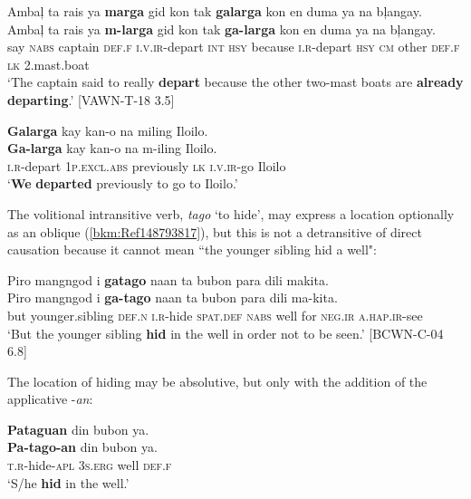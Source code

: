 \ea
\label{bkm:Ref148793705}
Ambaļ  ta  rais  ya  \textbf{marga}  gid  kon  tak \textbf{galarga}  kon  en  duma  ya  na  bļangay. \\\smallskip
\gll Ambaļ  ta  rais  ya  \textbf{m-larga}  gid  kon  tak \textbf{ga-larga}  kon  en  duma  ya  na  bļangay. \\
say  \textsc{nabs}  captain  \textsc{def.f}  \textsc{i.v.ir}-depart  \textsc{int}  \textsc{hsy}  because
\textsc{i.r}-depart  \textsc{hsy}  \textsc{cm}  other  \textsc{def.f}  \textsc{lk}  2.mast.boat \\
\glt ‘The captain said to really \textbf{depart} because the other two-mast boats are \textbf{already} \textbf{departing}.’ [VAWN-T-18 3.5]
\z

\ea
\label{bkm:Ref148793741}
\textbf{Galarga}  kay  kan-o  na  miling  Iloilo. \\\smallskip
\gll \textbf{Ga-larga}  kay  kan-o  na  m-iling  Iloilo. \\
\textsc{i.r}-depart  1\textsc{p.excl.abs}  previously  \textsc{lk}  \textsc{i.v.ir}-go  Iloilo \\
\glt ‘\textbf{We} \textbf{departed} previously to go to Iloilo.’
\z

The volitional intransitive verb, \textit{tago} ‘to hide’, may express a location optionally as an oblique (\ref{bkm:Ref148793817}), but this is not a detransitive of direct causation because it cannot mean ``the younger sibling hid a well":

\ea
\label{bkm:Ref148793817}
Piro  mangngod  i  \textbf{gatago}  naan  ta  bubon para  dili  makita.\\\smallskip
\gll Piro  mangngod  i  \textbf{ga-tago}  naan  ta  bubon para  dili  ma-kita.\\
but  younger.sibling  \textsc{def.n}  \textsc{i.r}-hide  \textsc{spat.def}  \textsc{nabs}  well
for  \textsc{neg.ir}  \textsc{a.hap.ir}-see \\
\glt ‘But the younger sibling \textbf{hid} in the well in order not to be seen.’ [BCWN-C-04 6.8]
\z

The location of hiding may be absolutive, but only with the addition of the applicative -\textit{an}:

\ea
\textbf{Pataguan}  din  bubon  ya. \\\smallskip
\gll \textbf{Pa-tago-an}  din  bubon  ya. \\
\textsc{t.r}-hide-\textsc{apl}  3\textsc{s.erg}  well  \textsc{def.f} \\
\glt ‘S/he \textbf{hid} in the well.’
\z

